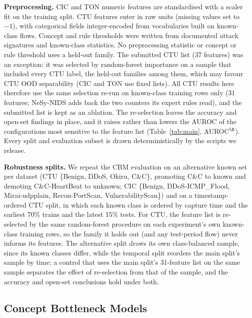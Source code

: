 \documentclass[journal]{IEEEtran}
\begin{document}
\textbf{Preprocessing.} CIC and TON numeric features are standardised with a scaler fit on the training split. CTU features enter in raw units (missing values set to $-1$), with categorical fields integer-encoded from vocabularies built on known-class flows. Concept and rule thresholds were written from documented attack signatures and known-class statistics. No preprocessing statistic or concept or rule threshold uses a held-out family. The submitted CTU list (37 features) was an exception: it was selected by random-forest importance on a sample that included every CTU label, the held-out families among them, which may favour CTU OOD separability (CIC and TON use fixed lists). All CTU results here therefore use the same selection re-run on known-class training rows only (31 features; NeSy-NIDS adds back the two counters its expert rules read), and the submitted list is kept as an ablation. The re-selection leaves the accuracy and open-set findings in place, and it raises rather than lowers the AUROC of the configurations most sensitive to the feature list (Table~\ref{tab:main}, AUROC$^\S$). Every split and evaluation subset is drawn deterministically by the scripts we release.

\textbf{Robustness splits.} We repeat the CBM evaluation on an alternative known set per dataset (CTU \{Benign, DDoS, Okiru, C\&C\}, promoting C\&C to known and demoting C\&C-HeartBeat to unknown; CIC \{Benign, DDoS-ICMP\_Flood, Mirai-udpplain, Recon-PortScan, VulnerabilityScan\}) and on a timestamp-ordered CTU split, in which each known class is ordered by capture time and the earliest 70\% trains and the latest 15\% tests. For CTU, the feature list is re-selected by the same random-forest procedure on each experiment's own known-class training rows, so the family it holds out (and any test-period flow) never informs its features. The alternative split draws its own class-balanced sample, since its known classes differ, while the temporal split reorders the main split's sample by time; a control that uses the main split's 31-feature list on the same sample separates the effect of re-selection from that of the sample, and the accuracy and open-set conclusions hold under both.

\subsection{Concept Bottleneck Models}
\label{sec:cbm}
\end{document}
